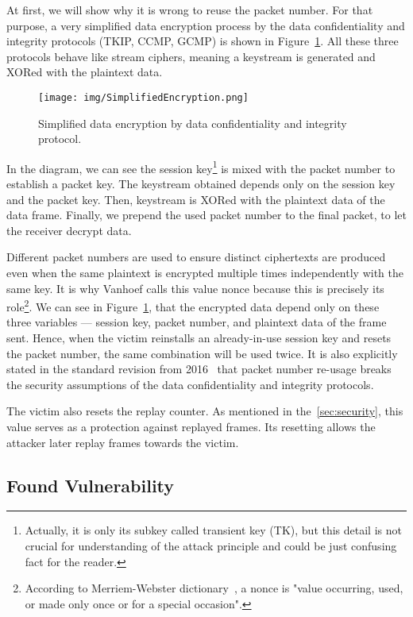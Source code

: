 At first, we will show why it is wrong to reuse the packet number. For that purpose, a very simplified data encryption process by the data confidentiality and integrity protocols (TKIP, CCMP, GCMP) is shown in Figure~\ref{fig:encryption}. All these three protocols behave like stream ciphers, meaning a keystream is generated and XORed with the plaintext data. 

\begin{figure}[h!]
  \centering
  \texttt{[image: img/SimplifiedEncryption.png]}
  \caption[Simplified data encryption]{Simplified data encryption by data confidentiality and integrity protocol.}
  \label{fig:encryption}
\end{figure}

In the diagram, we can see the session key\footnote{Actually, it is only its subkey called transient key (TK), but this detail is not crucial for understanding of the attack principle and could be just confusing fact for the reader.} is mixed with the packet number to establish a packet key. The keystream obtained depends only on the session key and the packet key. Then, keystream is XORed with the plaintext data of the data frame. Finally, we prepend the used packet number to the final packet, to let the receiver decrypt data.

Different packet numbers are used to ensure distinct ciphertexts are produced even when the same plaintext is encrypted multiple times independently with the same key. It is why Vanhoef calls this value nonce because this is precisely its role\footnote{According to Merriem-Webster dictionary~\cite{culpepper_2000merriam}, a nonce is "value occurring, used, or made only once or for a special occasion".}. We can see in Figure~\ref{fig:encryption}, that the encrypted data depend only on these three variables --- session key, packet number, and plaintext data of the frame sent. Hence, when the victim reinstalls an already-in-use session key and resets the packet number, the same combination will be used twice. It is also explicitly stated in the standard revision from 2016~\cite{revision2016} that packet number re-usage breaks the security assumptions of the data confidentiality and integrity protocols. 

The victim also resets the replay counter. As mentioned in the~\ref{sec:security}, this value serves as a protection against replayed frames. Its resetting allows the attacker later replay frames towards the victim.

\subsection{Found Vulnerability} 

